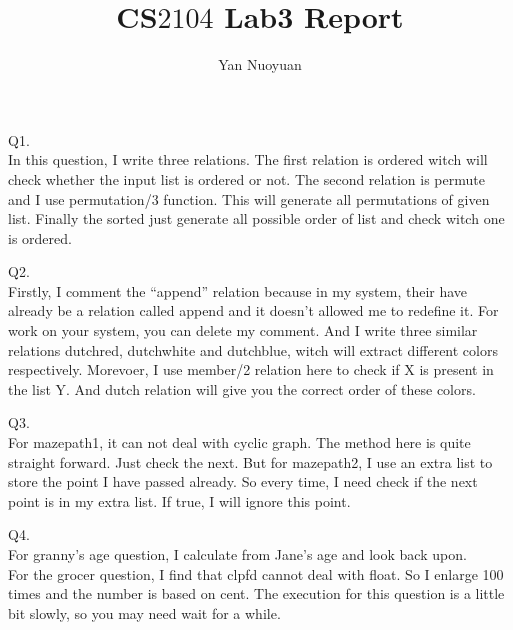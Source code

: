 \documentclass{article}
\author{Yan Nuoyuan}
\title{CS$2104$ Lab3 Report}
\begin{document}
\large
\maketitle
\setlength{\parindent}{2em}
\noindent Q1.\\
\indent In this question, I write three relations. The first
relation is ordered witch will check whether the input list is ordered or not. The second relation is permute and I use permutation/3 function. This will generate all permutations of given list. Finally the sorted just generate all possible order of list and check witch one is ordered.\\
\bigskip

\noindent Q2.\\
\indent Firstly, I comment the ``append'' relation because in my system, their have already be a relation called append and it doesn't allowed me to redefine it. For work on your system, you can delete my comment. And I write three similar relations dutchred, dutchwhite and dutchblue, witch will extract different colors respectively. Morevoer, I use member/2 relation here to check if X is present in the list Y. And dutch relation will give you the correct order of these colors.\\
\bigskip

\noindent Q3.\\
\indent For mazepath1, it can not deal with cyclic graph. The method here is quite straight forward. Just check the next. But for mazepath2, I use an extra list to store the point I have passed already. So every time, I need check if the next point is in my extra list. If true, I will ignore this point.\\
\bigskip

\noindent Q4.\\
\indent For granny's age question, I calculate from Jane's age and look back upon.\\
\indent For the grocer question, I find that clpfd cannot deal with float. So I enlarge 100 times and the number is based on cent. The execution for this question is a little bit slowly, so you may need wait for a while.
\end{document}
